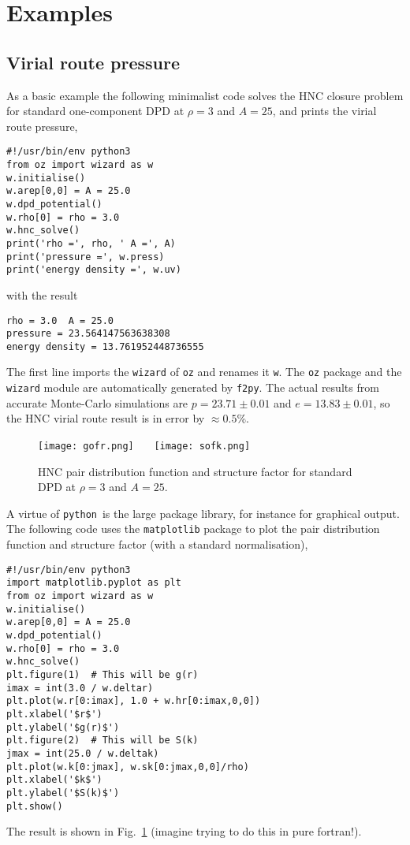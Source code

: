 \documentclass[12pt,a4paper]{article}
\newcommand{\FORTRAN}{{\sc fortran}}
\newcommand{\python}{{\tt python}}
\begin{document}
\section{Examples}
%
\subsection{Virial route pressure}
\label{sec:vrp}
%
As a basic example the following minimalist code solves the
HNC closure problem for standard one-component DPD at $\rho=3$ and
$A=25$, and prints the virial route pressure,
%
\begin{verbatim}
#!/usr/bin/env python3
from oz import wizard as w
w.initialise()
w.arep[0,0] = A = 25.0
w.dpd_potential()
w.rho[0] = rho = 3.0
w.hnc_solve()
print('rho =', rho, ' A =', A)
print('pressure =', w.press)
print('energy density =', w.uv)
\end{verbatim}
%
with the result
%
\begin{verbatim}
rho = 3.0  A = 25.0
pressure = 23.564147563638308
energy density = 13.761952448736555
\end{verbatim}
%
The first line imports the \verb+wizard+ of \verb+oz+ and renames it
\verb+w+.  The \verb+oz+ package and the \verb+wizard+ module are
automatically generated by \verb+f2py+.  The actual results from
accurate Monte-Carlo simulations are $p=23.71\pm0.01$ and
$e=13.83\pm0.01$, so the HNC virial route result is in error by
$\approx0.5$\%.

\begin{figure}
\begin{center}
\texttt{[image: gofr.png]}~~~%
\texttt{[image: sofk.png]}
\end{center}
\caption{HNC pair distribution function and structure factor for
  standard DPD at $\rho=3$ and $A=25$.\label{fig:gs}}
\end{figure}

A virtue of \python\ is the large package library, for instance for
graphical output.  The following code uses the \verb+matplotlib+
package to plot the pair distribution function and structure factor
(with a standard normalisation),
%
\begin{verbatim}
#!/usr/bin/env python3
import matplotlib.pyplot as plt
from oz import wizard as w
w.initialise()
w.arep[0,0] = A = 25.0
w.dpd_potential()
w.rho[0] = rho = 3.0
w.hnc_solve()
plt.figure(1)  # This will be g(r)
imax = int(3.0 / w.deltar)
plt.plot(w.r[0:imax], 1.0 + w.hr[0:imax,0,0])
plt.xlabel('$r$')
plt.ylabel('$g(r)$')
plt.figure(2)  # This will be S(k)
jmax = int(25.0 / w.deltak)
plt.plot(w.k[0:jmax], w.sk[0:jmax,0,0]/rho)
plt.xlabel('$k$')
plt.ylabel('$S(k)$')
plt.show()
\end{verbatim}
%
The result is shown in Fig.~\ref{fig:gs} (imagine trying to do this in
pure \FORTRAN!).
\end{document}
